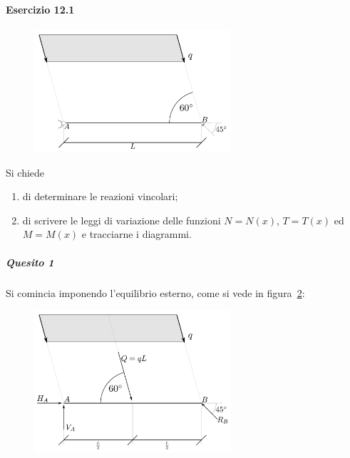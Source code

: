 \paragraph{Esercizio 12.1}
\renewcommand{\thefigure}{12.1~-~1}
\begin{figure}[ht]
\centering
\includegraphics[width=0.65\textwidth]{Immagini/Parte_12/Esercizio12_1_1/esercizio12_1_1.pdf}
\caption{}
\label{Esercizio12-1-1}
\end{figure}
Si chiede 
\begin{enumerate}
\item di determinare le reazioni vincolari;
\item di scrivere le leggi di variazione delle funzioni $N=N(x)$, $T=T(x)$ ed $M=M(x)$ e tracciarne i diagrammi.
\end{enumerate}
\subparagraph{Quesito 1}
Si comincia imponendo l'equilibrio esterno, come si vede in figura~\ref{Esercizio12-1-2}:
\renewcommand{\thefigure}{12.1~-~2}
\begin{figure}[ht]
\centering
\includegraphics[width=0.65\textwidth]{Immagini/Parte_12/Esercizio12_1_1/esercizio12_1_2.pdf}
\caption{}
\label{Esercizio12-1-2}
\end{figure}
